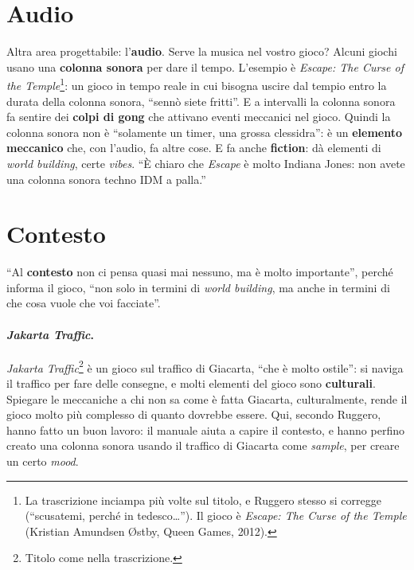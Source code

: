 \section{Audio}
\label{a10:sec:audio}

Altra area progettabile: l'\textbf{audio}. Serve la musica nel vostro gioco? Alcuni
giochi usano una \textbf{colonna sonora} per dare il tempo. L'esempio è \emph{Escape:
The Curse of the Temple}\footnote{La trascrizione inciampa più volte sul titolo, e
Ruggero stesso si corregge (``scusatemi, perché in tedesco\dots''). Il gioco è
\emph{Escape: The Curse of the Temple} (Kristian Amundsen \O{}stby, Queen Games, 2012).}: un
gioco in tempo reale in cui bisogna uscire dal tempio entro la durata della colonna
sonora, ``sennò siete fritti''. E a intervalli la colonna sonora fa sentire dei
\textbf{colpi di gong} che attivano eventi meccanici nel gioco. Quindi la colonna
sonora non è ``solamente un timer, una grossa clessidra'': è un \textbf{elemento
meccanico} che, con l'audio, fa altre cose. E fa anche \textbf{fiction}: dà elementi di
\emph{world building}, certe \emph{vibes}. ``È chiaro che \emph{Escape} è molto Indiana
Jones: non avete una colonna sonora techno IDM a palla.''

\section{Contesto}
\label{a10:sec:contesto}

``Al \textbf{contesto} non ci pensa quasi mai nessuno, ma è molto importante'', perché
informa il gioco, ``non solo in termini di \emph{world building}, ma anche in termini di
che cosa vuole che voi facciate''.

\paragraph{\emph{Jakarta Traffic}.} \emph{Jakarta Traffic}\footnote{Titolo come nella
trascrizione.} è un gioco sul traffico di Giacarta, ``che è molto ostile'': si naviga il
traffico per fare delle consegne, e molti elementi del gioco sono \textbf{culturali}.
Spiegare le meccaniche a chi non sa come è fatta Giacarta, culturalmente, rende il gioco
molto più complesso di quanto dovrebbe essere. Qui, secondo Ruggero, hanno fatto un
buon lavoro: il manuale aiuta a capire il contesto, e hanno perfino creato una colonna
sonora usando il traffico di Giacarta come \emph{sample}, per creare un certo
\emph{mood}.

